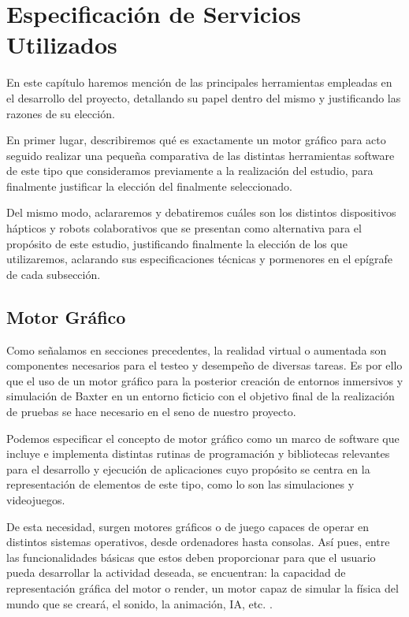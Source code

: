 \chapter{Especificación de Servicios Utilizados}

En este capítulo haremos mención de las principales herramientas empleadas en el desarrollo del proyecto, detallando su papel dentro del mismo y justificando las razones de su elección.

En primer lugar, describiremos qué es exactamente un motor gráfico para acto seguido realizar una pequeña comparativa de las distintas herramientas software de este tipo que consideramos previamente a la realización del estudio, para finalmente justificar la elección del finalmente seleccionado.

Del mismo modo, aclararemos y debatiremos cuáles son los distintos dispositivos hápticos y robots colaborativos que se presentan como alternativa para el propósito de este estudio, justificando finalmente la elección de los que utilizaremos, aclarando sus especificaciones técnicas y pormenores en el epígrafe de cada subsección.

\vfill

\section{Motor Gráfico}

Como señalamos en secciones precedentes, la realidad virtual o aumentada son componentes necesarios para el testeo y desempeño de diversas tareas. Es por ello que el uso de un motor gráfico para la posterior creación de entornos inmersivos y simulación de Baxter en un entorno ficticio con el objetivo final de la realización de pruebas se hace necesario en el seno de nuestro proyecto. 


Podemos especificar el concepto de motor gráfico como un marco de software que incluye e implementa distintas rutinas de programación y bibliotecas relevantes para el desarrollo y ejecución de aplicaciones cuyo propósito se centra en la representación de elementos de este tipo, como lo son las simulaciones y videojuegos. 

De esta necesidad, surgen motores gráficos o de juego capaces de operar en distintos sistemas operativos, desde ordenadores hasta consolas. Así pues, entre las funcionalidades básicas que estos deben proporcionar para que el usuario pueda desarrollar la actividad deseada, se encuentran: la capacidad de representación gráfica del motor o render, un motor capaz de simular la física del mundo que se creará, el sonido, la animación, IA, etc. \cite{49}.




